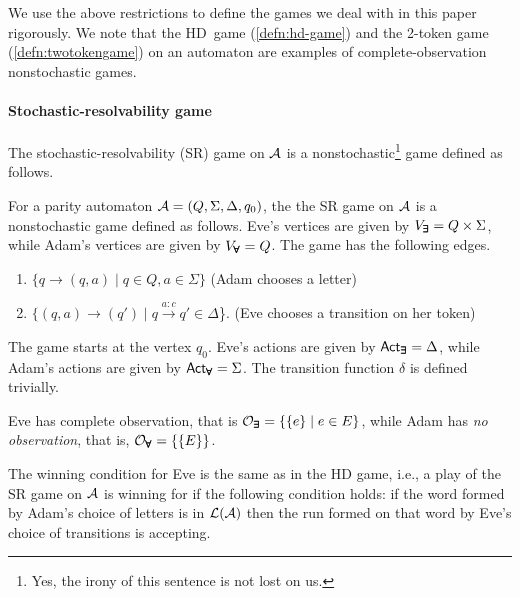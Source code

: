 We use the above restrictions to define the games we deal with in this paper rigorously. We note that the HD~game (\cref{defn:hd-game}) and the 2-token game (\cref{defn:twotokengame}) on an automaton are examples of complete-observation nonstochastic games. 

\paragraph*{Stochastic-resolvability game}
The stochastic-resolvability (SR) game on $\mathcal{A}$ is a nonstochastic\footnote{Yes, the irony of this sentence is not lost on us.} game defined as follows.
\begin{definition}
    For a parity automaton $\mathcal{A}=(Q,\Sigma,\Delta,q_0)$, the the SR game on $\mathcal{A}$ is a nonstochastic game defined as follows. Eve's vertices are given by $V_{\pmb{\exists}}=Q\times \Sigma$, while Adam's vertices are given by $V_{\pmb{\forall}}=Q$. The game has the following edges.
    \begin{enumerate}
        \item $\{q\xrightarrow{} (q,a) \mid q \in Q, a \in \Sigma\}$ (Adam chooses a letter) 
        \item $\{(q,a) \xrightarrow{} (q') \mid q\xrightarrow{a:c}q' \in \Delta$\}. (Eve chooses a transition on her token)
    \end{enumerate}
    The game starts at the vertex $q_0$. Eve's actions are given by ${\mathsf{Act}}_{\pmb{\exists}}= \Delta$, while Adam's actions are given by ${\mathsf{Act}}_{\pmb{\forall}}=\Sigma$. The transition function $\delta$ is defined trivially.

    \noindent Eve has complete observation, that is $\mathcal{O}_{\pmb{\exists}}=\{\{e\}\mid e\in E\}$, while Adam has \emph{no observation}, that is, $\mathcal{O}_{\pmb{\forall}}=\{\{E\}\}$. 
    
    \noindent The winning condition for Eve is the same as in the HD game, i.e., a play of the SR game on $\mathcal{A}$ is winning for if the following condition holds: if the word formed by Adam's choice of letters is in $\mathcal{L}(\mathcal{A})$ then the run formed on that word by Eve's choice of transitions is accepting.
\end{definition}


